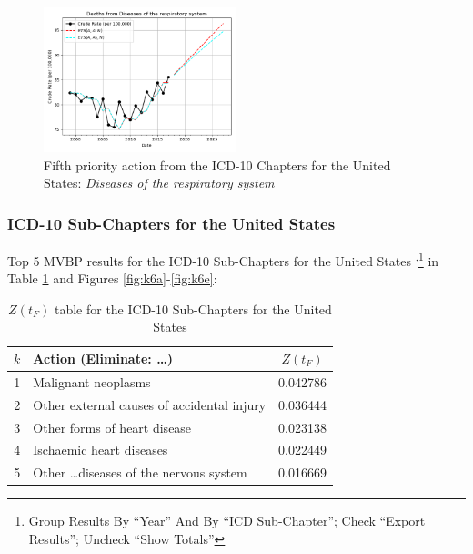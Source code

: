 \documentclass[10pt, a4paper, twocolumn]{IEEEconf}
\newcommand\footnotesstartsep{\textsuperscript{,}}
\begin{document}
\begin{figure}[H]
  \centering
  \includegraphics[width=0.5\textwidth]{results/US_ICD10_CHAPTERS/Diseases_of_the_respiratory_system_ets.png}
  \caption{Fifth priority action from the ICD-10 Chapters for the United States: \textit{Diseases of the respiratory system}}\label{fig:k5e}
\end{figure}

\clearpage

\subsubsection{ICD-10 Sub-Chapters for the United States}

Top 5 MVBP results for the ICD-10 Sub-Chapters for the United States \citep{centers2017underlying}\footnotesstartsep\footnote{Group Results By \enquote{Year} And By \enquote{ICD Sub-Chapter}; Check \enquote{Export Results}; Uncheck \enquote{Show Totals}} in Table \ref{table:ztable6} and Figures \ref{fig:k6a}-\ref{fig:k6e}:

\begin{table}[H]
  \centering
  \begin{tabular}{clc}
    \toprule
      $k$ & Action (Eliminate: \ldots) & $Z(t_F)$ \\
    \midrule
      1 &                               Malignant neoplasms & 0.042786 \\
      2 &        Other external causes of accidental injury & 0.036444 \\
      3 &                      Other forms of heart disease & 0.023138 \\
      4 &                          Ischaemic heart diseases & 0.022449 \\
      5 &       Other \ldots diseases of the nervous system & 0.016669 \\
    \bottomrule
  \end{tabular}
  \caption{$Z(t_F)$ table for the ICD-10 Sub-Chapters for the United States}
  \label{table:ztable6}
\end{table}
\end{document}
